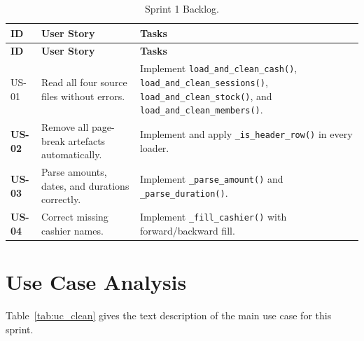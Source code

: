 \documentclass[12pt, a4paper]{report}
\begin{document}
\begin{longtable}{>{\bfseries}p{1.3cm} p{4.2cm} p{7cm}}
  \caption{Sprint 1 Backlog.\label{tab:sprint1_backlog}} \\
  \toprule
  \textbf{ID} & \textbf{User Story} & \textbf{Tasks} \\
  \midrule
  \endfirsthead
  \toprule
  \textbf{ID} & \textbf{User Story} & \textbf{Tasks} \\
  \midrule
  \endhead
  \bottomrule
  \endfoot

  US-01 & Read all four source files without errors.
        & Implement \texttt{load\_and\_clean\_cash()},
          \texttt{load\_and\_clean\_sessions()},
          \texttt{load\_and\_clean\_stock()}, and
          \texttt{load\_and\_clean\_members()}.\\[4pt]
  US-02 & Remove all page-break artefacts automatically.
        & Implement and apply \texttt{\_is\_header\_row()} in every loader. \\[4pt]
  US-03 & Parse amounts, dates, and durations correctly.
        & Implement \texttt{\_parse\_amount()} and \texttt{\_parse\_duration()}. \\[4pt]
  US-04 & Correct missing cashier names.
        & Implement \texttt{\_fill\_cashier()} with forward/backward fill. \\
\end{longtable}

\section{Use Case Analysis}

Table~\ref{tab:uc_clean} gives the text description of the main use case for this
sprint.
\end{document}
